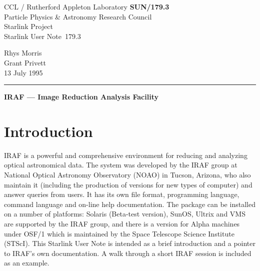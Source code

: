 \pagestyle{myheadings}

\newcommand{\stardoccategory}  {Starlink User Note}
\newcommand{\stardocinitials}  {SUN}
\newcommand{\stardocnumber}    {179.3}
\newcommand{\stardocauthors}   {Rhys Morris \\ Grant Privett}
\newcommand{\stardocdate}      {13 July 1995}
\newcommand{\stardoctitle}     {IRAF --- Image Reduction Analysis Facility}

\newcommand{\stardocname}{\stardocinitials /\stardocnumber}
\markright{\stardocname}
\setlength{\textwidth}{160mm}
\setlength{\textheight}{230mm}
\setlength{\topmargin}{-2mm}
\setlength{\oddsidemargin}{0mm}
\setlength{\evensidemargin}{0mm}
\setlength{\parindent}{0mm}
\setlength{\parskip}{\medskipamount}
\setlength{\unitlength}{1mm}


\thispagestyle{empty}
CCL / {\sc Rutherford Appleton Laboratory} \hfill {\bf \stardocname}\\
{\large Particle Physics \& Astronomy Research Council}\\
{\large Starlink Project\\}
{\large \stardoccategory\ \stardocnumber}
\begin{flushright}
\stardocauthors\\
\stardocdate
\end{flushright}
\vspace{-4mm}
\rule{\textwidth}{0.5mm}
\vspace{5mm}
\begin{center}
{\Large\bf \stardoctitle}
\end{center}
\vspace{5mm}

\setlength{\parskip}{0mm}
\tableofcontents
\setlength{\parskip}{\medskipamount}
\markright{\stardocname}

\newpage
\section{Introduction}

IRAF is a powerful and comprehensive environment for reducing and
analyzing optical astronomical data.  The system was developed by the
IRAF group at National Optical Astronomy Observatory (NOAO) in Tucson,
Arizona, who also maintain it (including the production of versions for
new types of computer) and answer queries from users. It has its own
file format, programming language, command language and on-line help
documentation.  The package can be installed on a number of platforms:
Solaris (Beta-test version), SunOS, Ultrix and VMS are supported by the
IRAF group, and there is a version for Alpha machines under OSF/1 which
is maintained by the Space Telescope Science Institute (STScI). This
Starlink User Note is intended as a brief introduction and a pointer to
IRAF's own documentation.  A walk through a short IRAF session is
included as an example.

